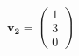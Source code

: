 \documentclass[preview]{standalone}
\begin{document}
\begin{align*}
\mathbf{v_2} = \begin{pmatrix} 1 \\ 3 \\ 0 \end{pmatrix}
\end{align*}
\end{document}
